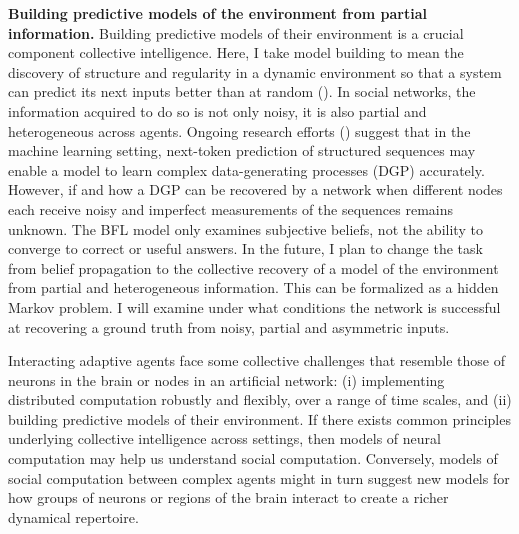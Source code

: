 \documentclass[]{article}
\begin{document}
\textbf{Building predictive models of the environment from partial information.} Building predictive models of their environment is a crucial component collective intelligence. Here, I take model building to mean the discovery of structure and regularity in a dynamic environment so that a system can predict its next inputs better than at random (\cite{crutchfieldCalculiEmergenceComputation1994}). In social networks, the information acquired to do so is not only noisy, it is also partial and heterogeneous across agents. Ongoing research efforts (\cite{malachAutoRegressiveNextTokenPredictors2023}) suggest that in the machine learning setting, next-token prediction of structured sequences may enable a model to learn complex data-generating processes (DGP) accurately. However, if and how a DGP can be recovered by a network when different nodes each receive noisy and imperfect measurements of the sequences remains unknown. The BFL model only examines subjective beliefs, not the ability to converge to correct or useful answers. In the future, I plan to change the task from belief propagation to the collective recovery of a model of the environment from partial and heterogeneous information. This can be formalized as a hidden Markov problem. I will examine under what conditions the network is successful at recovering a ground truth from noisy, partial and asymmetric inputs. 

Interacting adaptive agents face some collective challenges that resemble those of neurons in the brain or nodes in an artificial network: (i) implementing distributed computation robustly and flexibly, over a range of time scales, and (ii) building predictive models of their environment. If there exists common principles underlying collective intelligence across settings, then models of neural computation may help us understand social computation. Conversely, models of social computation between complex agents might in turn suggest new models for how groups of neurons or regions of the brain interact to create a richer dynamical repertoire.

\printbibliography[heading=bibintoc, title={References}]
\end{document}
